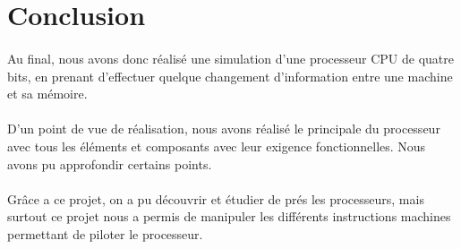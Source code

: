 \section{Conclusion}
\label{sec:conclusion}

\paragraph{} Au final, nous avons donc réalisé une simulation d'une processeur  CPU de quatre bits, en prenant d’effectuer quelque changement d'information entre une machine et sa mémoire.

\paragraph{} D'un point de vue de réalisation, nous avons réalisé le principale du processeur avec tous les éléments et composants avec leur exigence fonctionnelles. Nous avons pu approfondir certains points.

\paragraph{} Grâce a ce projet, on a pu découvrir et étudier de prés les processeurs, mais surtout ce projet nous a permis de manipuler les différents instructions machines permettant de piloter le processeur.

